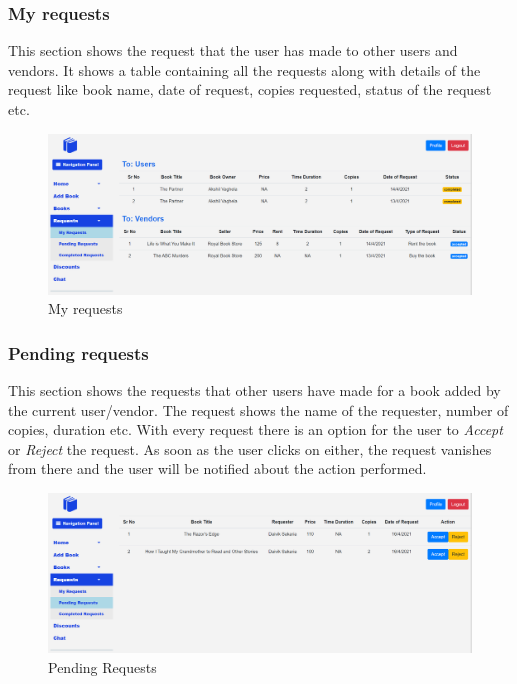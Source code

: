 \documentclass[conference]{IEEEtran}
\begin{document}
\subsubsection{My requests}
This section shows the request that the user has made to other users and vendors. It shows a table containing all the requests along with details of the request like book name, date of request, copies requested, status of the request etc.
\begin{figure}[h]
     \centering
     \includegraphics[scale=0.20,margin=2,frame]{myrequests.PNG}
     \caption{My requests}
     \label{fig:myrequests}
 \end{figure}

\subsubsection{Pending requests}
This section shows the requests that other users have made for a book added by the current user/vendor. The request shows the name of the requester, number of copies, duration etc. With every request there is an option for the user to \emph{Accept} or \emph{Reject} the request. As soon as the user clicks on either, the request vanishes from there and the user will be notified about the action performed.
\begin{figure}[h]
     \centering
     \includegraphics[scale=0.20,margin=2,frame]{pendingrequests.PNG}
     \caption{Pending Requests}
     \label{fig:pendingrequests}
 \end{figure}
\end{document}

